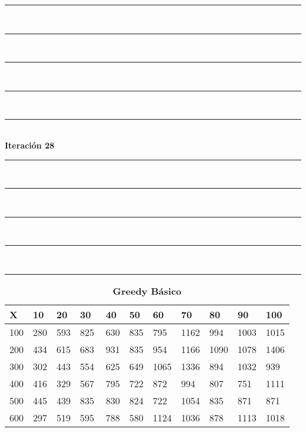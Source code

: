 \documentclass[10pt,letterpaper]{article}
\begin{document}
\newpage 
\begin{center}
\newcommand{\HRule}{\rule{\linewidth}{0.5mm}}
\center
\HRule\\[6cm]
\HRule\\[0.4cm]
\HRule\\[0.4cm]
\HRule\\[0.4cm]
\HRule\\[0.4cm]
{\centering \Huge\bfseries Iteración 28}\\[0.4cm]
\HRule\\[0.4cm]
\HRule\\[0.4cm]
\HRule\\[0.4cm]
\HRule\\[6cm]
\HRule
\end{center}
\newpage 
{}
\begin{center}
\begin{table}\renewcommand{\arraystretch}{2.5}
\caption{\large \textbf{Greedy Básico}}
\centering
\begin{tabular} { |m{0.5cm}|m{1.3cm}|m{1.3cm}|m{1.3cm}|m{1.3cm}|m{1.3cm}|m{1.3cm}|m{1.3cm}|m{1.3cm}|m{1.3cm}|m{1.3cm}|} 
\hline
\rowcolor{Gray}
\centering \textbf{X} & \centering \textbf{10} & \centering \textbf{20} & \centering \textbf{30}\ & \centering \textbf{40} & \centering \textbf{50} & \centering \textbf{60}\ & \centering \textbf{70} & \centering \textbf{80} & \centering \textbf{90}\ & \textbf{100} \\\hline
\cellcolor{Gray}100 & \Large 280 & \Large 593 & \Large 825 & \Large 630 & \Large 835 & \Large 795 & \Large 1162 & \Large 994 & \Large 1003 & \Large 1015 \\
\hline
\cellcolor{Gray}200 & \Large 434 & \Large 615 & \Large 683 & \Large 931 & \Large 835 & \Large 954 & \Large 1166 & \Large 1090 & \Large 1078 & \Large 1406 \\
\hline
\cellcolor{Gray}300 & \Large 302 & \Large 443 & \Large 554 & \Large 625 & \Large 649 & \Large 1065 & \Large 1336 & \Large 894 & \Large 1032 & \Large 939 \\
\hline
\cellcolor{Gray}400 & \Large 416 & \Large 329 & \Large 567 & \Large 795 & \Large 722 & \Large 872 & \Large 994 & \Large 807 & \Large 751 & \Large 1111 \\
\hline
\cellcolor{Gray}500 & \Large 445 & \Large 439 & \Large 835 & \Large 830 & \Large 824 & \Large 722 & \Large 1054 & \Large 835 & \Large 871 & \Large 871 \\
\hline
\cellcolor{Gray}600 & \Large 297 & \Large 519 & \Large 595 & \Large 788 & \Large 580 & \Large 1124 & \Large 1036 & \Large 878 & \Large 1113 & \Large 1018 \\

\end{tabular}
\end{table}
\end{center}
\end{document}

